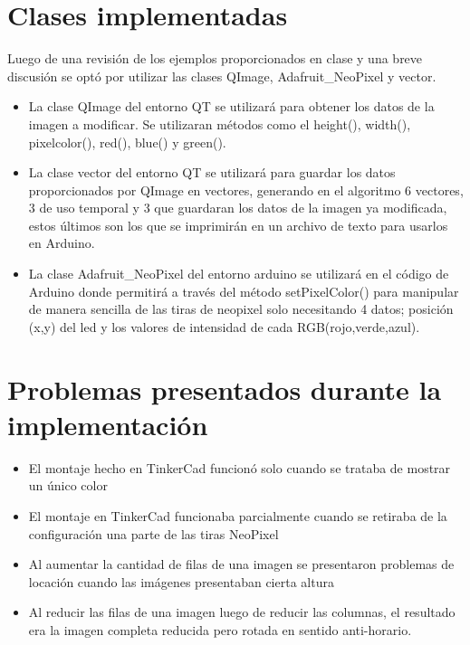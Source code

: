 \documentclass{article}
\begin{document}
	\section{Clases implementadas} \label{Clases}
	Luego de una revisión de los ejemplos proporcionados en clase y una breve discusión se optó por utilizar las clases QImage, Adafruit\_NeoPixel y vector.
	
	\begin{itemize}
	    \item La clase QImage del entorno QT se utilizará para obtener los datos de la imagen a modificar. Se utilizaran métodos como el height(), width(), pixelcolor(), red(), blue() y green().
	    \item La clase vector del entorno QT se utilizará para guardar los datos proporcionados por QImage en vectores, generando en el algoritmo 6 vectores, 3 de uso temporal y 3 que guardaran los datos de la imagen ya modificada, estos últimos son los que se imprimirán en un archivo de texto para usarlos en Arduino.
	    \item 	La clase Adafruit\_NeoPixel del entorno arduino se utilizará en el código de Arduino donde permitirá a través del método setPixelColor() para manipular de manera sencilla de las tiras de neopixel solo necesitando 4 datos; posición (x,y) del led y los valores de intensidad de cada RGB(rojo,verde,azul).
	\end{itemize}
	
	\section{Problemas presentados durante la implementación}
	\begin{itemize}
	    \item El montaje hecho en TinkerCad funcionó solo cuando se trataba de mostrar un único color
	    \item El montaje en TinkerCad funcionaba parcialmente cuando se retiraba de la configuración una parte de las tiras NeoPixel
	    \item Al aumentar la cantidad de filas de una imagen se presentaron problemas de locación cuando las imágenes presentaban cierta altura
	    \item Al reducir las filas de una imagen luego de reducir las columnas, el resultado era la imagen completa reducida pero rotada en sentido anti-horario.
	\end{itemize}
	
\end{document}
